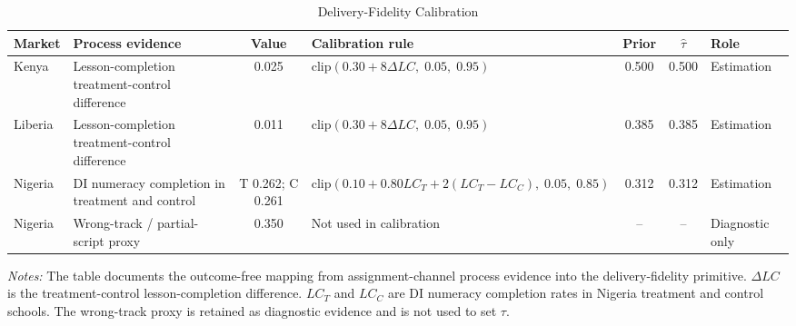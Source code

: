 \begin{table}[H]
\centering
\caption{Delivery-Fidelity Calibration}
\label{tab:struct_tau_calibration}
\begin{threeparttable}
\scriptsize
\setlength{\tabcolsep}{3pt}
\begin{tabular}[t]{>{\raggedright\arraybackslash}p{1.5cm}>{\raggedright\arraybackslash}p{3.6cm}c>{\raggedright\arraybackslash}p{4.6cm}cc>{\raggedright\arraybackslash}p{1.8cm}}
\toprule
Market & Process evidence & Value & Calibration rule & Prior & $\hat{\tau}$ & Role \\
\midrule
Kenya & Lesson-completion treatment-control difference & 0.025 & $\mathrm{clip}(0.30+8\Delta LC,\;0.05,\;0.95)$ & 0.500 & 0.500 & Estimation \\
Liberia & Lesson-completion treatment-control difference & 0.011 & $\mathrm{clip}(0.30+8\Delta LC,\;0.05,\;0.95)$ & 0.385 & 0.385 & Estimation \\
Nigeria & DI numeracy completion in treatment and control & T 0.262; C 0.261 & $\mathrm{clip}(0.10+0.80LC_T+2(LC_T-LC_C),\;0.05,\;0.85)$ & 0.312 & 0.312 & Estimation \\
Nigeria & Wrong-track / partial-script proxy & 0.350 & Not used in calibration & -- & -- & Diagnostic only \\
\bottomrule
\end{tabular}
\begin{tablenotes}
\footnotesize
\item \textit{Notes:} The table documents the outcome-free mapping from assignment-channel process evidence into the delivery-fidelity primitive. $\Delta LC$ is the treatment-control lesson-completion difference. $LC_T$ and $LC_C$ are DI numeracy completion rates in Nigeria treatment and control schools. The wrong-track proxy is retained as diagnostic evidence and is not used to set $\tau$.
\end{tablenotes}
\end{threeparttable}
\end{table}

